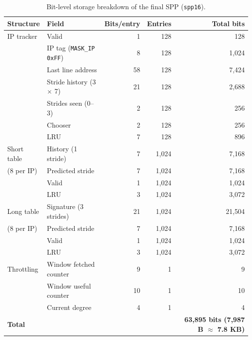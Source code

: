 \documentclass[12pt, a4paper]{article}
\newcommand{\tablesetup}{\small\renewcommand{\arraystretch}{1.15}\setlength{\tabcolsep}{4pt}}
\newcommand{\colhead}[1]{\textbf{#1}}
\begin{document}
\begin{table}[htbp]
\centering
\caption{Bit-level storage breakdown of the final SPP (\texttt{spp16}).}\label{tab:spp-storage}
\tablesetup
\begin{tabular}{llrrr}
\toprule
\rowcolor{tablehead}\colhead{Structure} & \colhead{Field} & \colhead{Bits/entry} & \colhead{Entries} & \colhead{Total bits} \\
\midrule
IP tracker     & Valid                          & 1  & 128 & 128 \\
               & IP tag (\texttt{MASK\_IP 0xFF}) & 8  & 128 & 1{,}024 \\
               & Last line address              & 58 & 128 & 7{,}424 \\
               & Stride history (3 $\times$ 7)  & 21 & 128 & 2{,}688 \\
               & Strides seen (0--3)            & 2  & 128 & 256 \\
               & Chooser                        & 2  & 128 & 256 \\
               & LRU                            & 7  & 128 & 896 \\
\midrule
Short table    & History (1 stride)             & 7  & 1{,}024 & 7{,}168 \\
(8 per IP)     & Predicted stride               & 7  & 1{,}024 & 7{,}168 \\
               & Valid                          & 1  & 1{,}024 & 1{,}024 \\
               & LRU                            & 3  & 1{,}024 & 3{,}072 \\
\midrule
Long table     & Signature (3 strides)          & 21 & 1{,}024 & 21{,}504 \\
(8 per IP)     & Predicted stride               & 7  & 1{,}024 & 7{,}168 \\
               & Valid                          & 1  & 1{,}024 & 1{,}024 \\
               & LRU                            & 3  & 1{,}024 & 3{,}072 \\
\midrule
Throttling     & Window fetched counter         & 9  & 1 & 9 \\
               & Window useful counter          & 10 & 1 & 10 \\
               & Current degree                 & 4  & 1 & 4 \\
\midrule
\multicolumn{4}{l}{\textbf{Total}} & \textbf{63{,}895 bits (7{,}987 B $\approx$ 7.8 KB)} \\
\bottomrule
\end{tabular}
\end{table}
\end{document}
